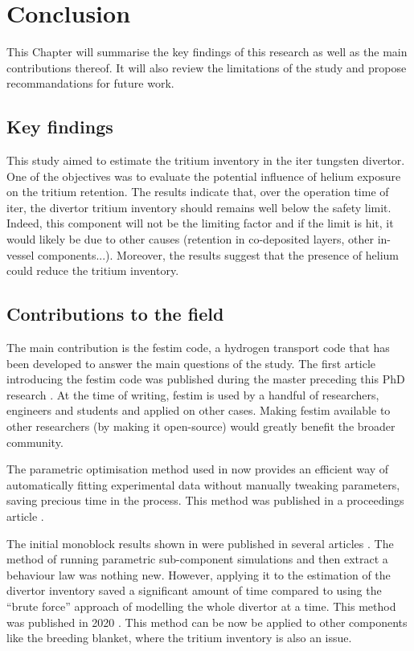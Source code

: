 \setchapterpreamble[u]{\margintoc}
\chapter{Conclusion}

This Chapter will summarise the key findings of this research as well as the main contributions thereof.
It will also review the limitations of the study and propose recommandations for future work.

\section*{Key findings}

This study aimed to estimate the tritium inventory in the \gls{iter} tungsten \gls{divertor}.
One of the objectives was to evaluate the potential influence of helium exposure on the tritium retention.
The results indicate that, over the operation time of \gls{iter}, the \gls{divertor} tritium inventory should remains well below the safety limit.
Indeed, this component will not be the limiting factor and if the limit is hit, it would likely be due to other causes (retention in co-deposited layers, other in-vessel components...).
Moreover, the results suggest that the presence of helium could reduce the tritium inventory.

\section*{Contributions to the field}
The main contribution is the \gls{festim} code, a hydrogen transport code that has been developed to answer the main questions of the study.
The first article introducing the \gls{festim} code was published during the master preceding this PhD research \cite{delaporte-mathurin_finite_2019}.
At the time of writing, \gls{festim} is used by a handful of researchers, engineers and students and applied on other cases.
Making \gls{festim} available to other researchers (by making it open-source) would greatly benefit the broader community.

The parametric optimisation method used in  now provides an efficient way of automatically fitting experimental data without manually tweaking parameters, saving precious time in the process.
This method was published in a proceedings article \cite{delaporte-mathurin_parametric_2021}.

The initial monoblock results shown in  were published in several articles \cite{delaporte-mathurin_finite_2019, delaporte-mathurin_parametric_2021, delaporte-mathurin_influence_2021-1}.
The method of running parametric sub-component simulations and then extract a behaviour law was nothing new.
However, applying it to the estimation of the \gls{divertor} inventory saved a significant amount of time compared to using the ``brute force'' approach of modelling the whole \gls{divertor} at a time.
This method was published in 2020 \cite{delaporte-mathurin_parametric_2020}.
This method can be now be applied to other components like the \gls{breeding blanket}, where the tritium inventory is also an issue.

